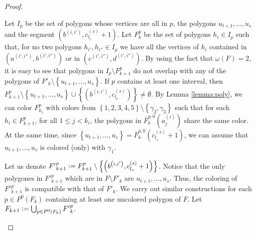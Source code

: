 \documentclass[12pt]{article}
\theoremstyle{definition}
\newcommand{\defeq}{\vcentcolon=}
\begin{document}
\begin{proof}
\begin{itemize}
                 Let $I_{p}$ be the set of polygons
                 whose vertices are all
                 in $p$, the polygons
                 $u_{t+1}, \ldots, u_{s}$ and 
                 the segment $\left(b^{\left(i, i'\right)},
                 c_{l_{s}}^{\left(s\right)} + 1\right)$.
                 Let $F_{k}^{p}$ be the set of
                 polygons $h_{i} \in I_{p}$ 
                 such that, for no two polygons
                 $h_{i'}, h_{i''} \in I_{p}$
                 we have all the vertices
                 of $h_{i}$ contained in
                 $\left(a^{\left(i', i''\right)},
                 b^{\left(i', i''\right)}\right)$ 
                 or in
                 $\left(c^{\left(i',i''\right)}, 
                 d^{\left(i',i''\right)}\right)$.
                 By using the fact
                 that $\omega\left(F\right) = 2$,
                 it is easy to see that 
                 polygons in $I_{p} \setminus F_{k+1}^{p}$ 
                 do not overlap with 
                 any of the polygons of
                 $F'_{k} \setminus \left\{u_{t+1}, \ldots
                 , u_{s}\right\}$.
                 If $p$ contains at least
                 one interval, 
                 then 
                 $F_{k+1}^{p} 
                 \setminus 
                 \left\{u_{t+1}, \ldots, u_{s}\right\}
                 \cup 
                 \left\{\left(
                 b^{\left(i, i'\right)},
                 c_{l_{s}}^{\left(s\right)}\right)\right\}
                 \neq \emptyset$.
                 By Lemma \ref{lemma:poly},
                 we can color $F_{k_1}^{p}$ with
                 colors from 
                 $\left\{1, 2, 3, 4, 5\right\} \setminus 
                 \left\{\gamma_2, \gamma_3\right\}$
                 such that for each $h_{i} \in F_{k+1}^{p}$,
                 for all
                 $1 \leq j < k_{i}$, the polygons in
                 $\overline{F}_{k}^{p, 0}\left(a_{j}^{\left(i\right)}\right)$ 
                 share the same color. At the same time,
                 since $\left\{u_{t +1}, \ldots, u_{s}\right\} = 
                 \overline{F}_{k}^{p, 0}\left(c_{l_{s}}^{\left(s\right)} + 1\right)$,
                 we can assume that $u_{t + 1}, \ldots, u_{s}$ 
                 is colored (only) with $\gamma_1$.

                 Let us denote ${F'}_{k+1}^{p} \defeq
                 F_{k+1}^{p} \setminus \left\{\left(
                 b^{\left(i, i'\right)},
                 c_{l_{s}}^{\left(s\right)} + 1\right)\right\}$.
                 Notice that the only
                 polygones in ${F'}_{k+1}^{p}$ 
                 which are in $F \setminus F'_{k}$ 
                 are $u_{t + 1}, \ldots, u_{s}$.
                 Thus, the coloring of
                 ${F'}_{k+1}^{p}$ is compatible with that 
                 of $F'_{k}$. We carry out similar 
                 constructions for each 
                 $p \in P^{0}\left(F_{k}\right)$ 
                 containing at least one uncolored
                 polygon of $F$. Let 
                 $F_{k+1} \defeq \bigcup_{p \in P^{0}\left(F_{k}\right)}
                 {F'}_{k}^{p}$.


\end{itemize}
\end{proof}
\end{document}
